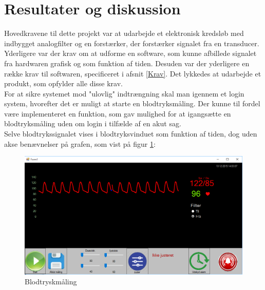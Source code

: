 \section{Resultater og diskussion}
Hovedkravene til dette projekt var at udarbejde et elektronisk kredsløb med indbygget analogfilter og en forstærker, der forstærker signalet fra en transducer. Yderligere var der krav om at udforme en software, som kunne afbillede signalet fra hardwaren grafisk og som funktion af tiden. Desuden var der yderligere en række krav til softwaren, specificeret i afsnit \ref{Krav}. Det lykkedes at udarbejde et produkt, som opfylder alle disse krav. \\[1ex]

For at sikre systemet mod "ulovlig" indtrængning skal man igennem et login system, hvorefter det er muligt at starte en blodtryksmåling. Der kunne til fordel være implementeret en funktion, som gav mulighed for at igangsætte en blodtryksmåling uden om login i tilfælde af en akut sag.\\ 
Selve blodtrykssignalet vises i blodtryksvinduet som funktion af tiden, dog uden akse benævnelser på grafen, som vist på figur \ref{blodtryk}:

\begin{figure}[H]
	\centering
	\includegraphics[width=1\textwidth]{Figurer/SoftwareImplementering/blodtryk}
	\caption{Blodtryskmåling}
	\label{blodtryk}
\end{figure}

